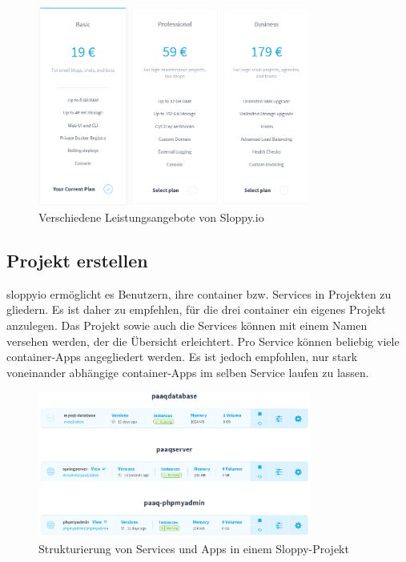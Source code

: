 \documentclass[../main.tex]{subfiles}
\begin{document}
	\begin{figure}[H]
		\centering
		\includegraphics[width=0.8\textwidth]{../images/SloppyProductPlans} 
		\caption{Verschiedene Leistungsangebote von Sloppy.io}
		\label{fig:SloppyProductPlans}
	\end{figure}

	\subsection{Projekt erstellen}
	\gls{sloppyio} ermöglicht es Benutzern, ihre \gls{container} bzw. Services in Projekten zu gliedern. Es ist daher zu empfehlen, für die drei \gls{container} ein eigenes Projekt anzulegen. Das Projekt sowie auch die Services können mit einem Namen versehen werden, der die Übersicht erleichtert. Pro Service können beliebig viele \gls{container}-Apps angegliedert werden. Es ist jedoch empfohlen, nur stark voneinander abhängige \gls{container}-Apps im selben Service laufen zu lassen.
	
	\begin{figure}[H]
		\centering
		\includegraphics[width=0.8\textwidth]{../images/SloppyProjectStructure} 
		\caption{Strukturierung von Services und Apps in einem Sloppy-Projekt}
		\label{fig:SloppyProjectStructure}
	\end{figure}
	
\end{document}
